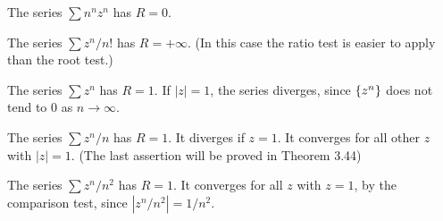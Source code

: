 \begin{myExample}
    \begin{asparaenum}[(a)]
    \item The series $\sum n^n z^n$ has $R = 0$.
    \item The series $\sum z^n / n!$ has $R = +\infty$.
    (In this case the ratio test is easier to apply than the root test.)
    \item The series $\sum z^n$ has $R = 1$.
    If $|z| = 1$, the series diverges, since $\protect\{z^n\}$ does not tend to $0$ as $n \rightarrow \infty $.
    \item The series $\sum z^n / n$ has $R = 1$.
    It diverges if $z = 1$. It converges for all other $z$ with $|z|=1$.
    (The last assertion will be proved in Theorem 3.44)
    \item The series $\sum z^n / n^2$ has $R = 1$.
    It converges for all $z$ with $z = 1$,
    by the comparison test, since $|z^n/n^2| = 1/n^2$.
    \end{asparaenum}
\end{myExample}